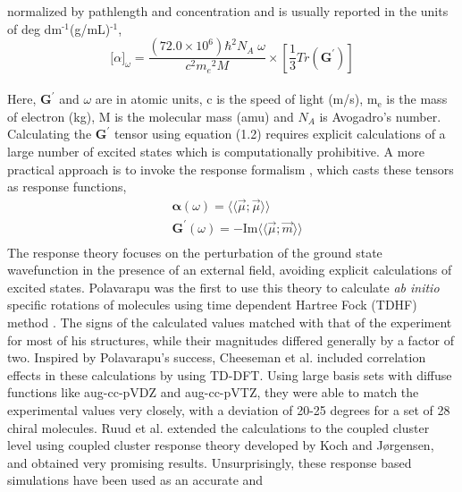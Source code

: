 normalized by pathlength and concentration and is usually reported in the units of deg dm$^{\text{-1}}$(g/mL)$^{\text{-1}}$,\cite{Crawford06}
\\
\begin{equation}
{\lbrack\alpha\rbrack}_{\omega} = \frac{(72.0 \times 10^6){\hbar}^2 N_A\;\omega}{c^2{m_e}^2 M} \times \left[ \frac{1}{3}Tr(\textbf{G}^\prime)\right]
\end{equation}
\\
Here, $\textbf{G}^\prime$ and $\omega$ are in atomic units, c is the speed of light (m/s), m$_{\text{e}}$ is the 
mass of electron (kg), M is the molecular mass (amu) and $N_A$ is Avogadro's number. Calculating the 
$\textbf{G}^\prime$ tensor using equation (1.2) requires explicit calculations of a large number of 
excited states which is computationally prohibitive. A more practical approach is to invoke the response formalism
\cite{Koch90,Kobayashi94}, which casts these tensors as response functions,
\begin{equation}
\begin{split}
&\bm{\alpha}(\omega) = \langle\langle\vec{\mu};\vec{\mu}\rangle\rangle\\
&\textbf{G}^{\prime}(\omega) = -\text{Im}\langle\langle\vec{\mu};\vec{m}\rangle\rangle\\
\end{split}
\end{equation} 
The response theory focuses on the perturbation of the ground state wavefunction in the presence of an external 
field, avoiding explicit calculations of excited states. Polavarapu was the first to use this theory to calculate 
{\em ab initio} specific rotations of molecules using time dependent Hartree Fock (TDHF) method \cite{Polavarapu96}. 
The signs of the calculated values matched with that of the experiment for most of his structures, while their magnitudes 
differed generally by a factor of two. Inspired by Polavarapu's success, Cheeseman et al. \cite{Cheeseman00,Stephens01} 
included correlation effects in these calculations by using TD-DFT. Using large basis sets with diffuse functions like 
aug-cc-pVDZ and aug-cc-pVTZ,\cite{Dunning89} they were able to match the experimental values very closely, with a 
deviation of 20-25 degrees for a set of 28 chiral molecules. Ruud et al. extended the calculations to the coupled cluster 
level using coupled cluster response theory developed by Koch and J{\o}rgensen\cite{Koch90}, and obtained very 
promising results\cite{Ruud03}. Unsurprisingly, these response based simulations have been used as an accurate and 
